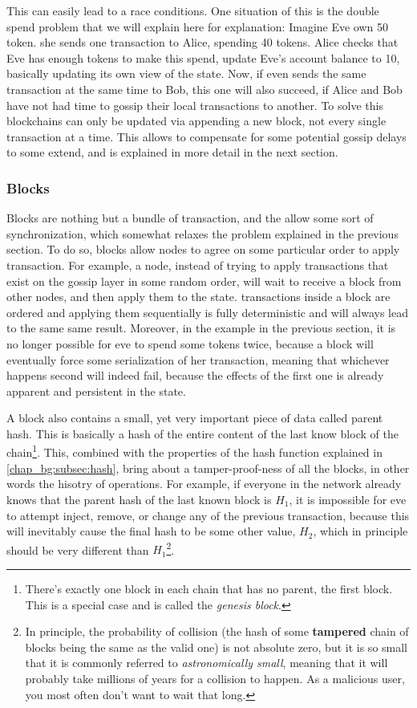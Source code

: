 This can easily lead to a race conditions. One situation of this is the double spend problem that we
will explain here for explanation: Imagine Eve own 50 token. she sends one transaction to Alice,
spending 40 tokens. Alice checks that Eve has enough tokens to make this spend, update Eve's account
balance to 10, basically updating its own view of the state. Now, if even sends the same transaction
at the same time to Bob, this one will also succeed, if Alice and Bob have not had time to gossip
their local transactions to another. To solve this blockchains can only be updated via appending a
new block, not every single transaction at a time. This allows to compensate for some potential
gossip delays to some extend, and is explained in more detail in the next section.

\subsubsection{Blocks} \label{chap_bg:subsec:block}

Blocks are nothing but a bundle of transaction, and the allow some sort of synchronization, which
somewhat relaxes the problem explained in the previous section. To do so, blocks allow nodes to
agree on some particular order to apply transaction. For example, a node, instead of trying to apply
transactions that exist on the gossip layer in some random order, will wait to receive a block from
other nodes, and then apply them to the state. transactions inside a block are ordered and applying
them sequentially is fully deterministic and will always lead to the same same result. Moreover, in
the example in the previous section, it is no longer possible for eve to spend some tokens twice,
because a block will eventually force some serialization of her transaction, meaning that whichever
happens second will indeed fail, because the effects of the first one is already apparent and
persistent in the state.

A block also contains a small, yet very important piece of data called parent hash. This is
basically a hash of the entire content of the last know block of the chain\footnote{There's exactly
one block in each chain that has no parent, the first block. This is a special case and is called
the \textit{genesis block}.}. This, combined with the properties of the hash function explained in
\ref{chap_bg:subsec:hash}, bring about a tamper-proof-ness of all the blocks, in other words the
hisotry of operations. For example, if everyone in the network already knows that the parent hash of
the last known block is $H_1$, it is impossible for eve to attempt inject, remove, or change any of
the previous transaction, because this will inevitably cause the final hash to be some other value,
$H_2$, which in principle should be very different than $H_1$\footnote{In principle, the probability
of collision (the hash of some \textbf{tampered} chain of blocks being the same as the valid one) is
not absolute zero, but it is so small that it is commonly referred to \textit{astronomically small},
meaning that it will probably take millions of years for a collision to happen. As a malicious user,
you most often don't want to wait that long.}.

